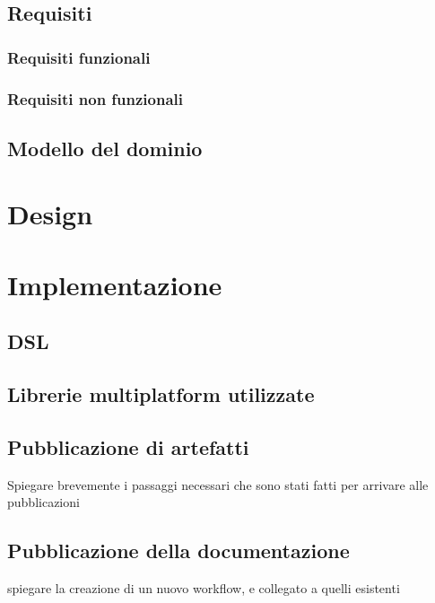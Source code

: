 \documentclass[12pt,a4paper,openright,twoside]{book}
\begin{document}
\section{Requisiti}

    \subsection{Requisiti funzionali}

    \subsection{Requisiti non funzionali}

\section{Modello del dominio}
\chapter{Design}
\chapter{Implementazione}

\section{DSL }

\section{Librerie multiplatform utilizzate}

\section{Pubblicazione di artefatti}
Spiegare brevemente i passaggi necessari che sono stati fatti per arrivare
alle pubblicazioni

\section{Pubblicazione della documentazione}
spiegare la creazione di un nuovo workflow, e collegato a quelli esistenti
\end{document}
